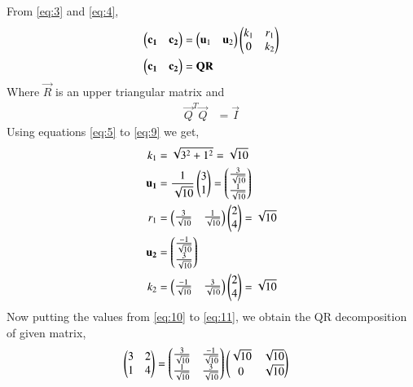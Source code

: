 \documentclass[journal,12pt,twocolumn]{IEEEtran}
\begin{document}
From \eqref{eq:3} and \eqref{eq:4}, 
\begin{align}
\begin{pmatrix}\mathbf{c_1} & \mathbf{c_2}\end{pmatrix} &= \begin{pmatrix}\mathbf{u}_1 & \mathbf{u}_2\end{pmatrix}\begin{pmatrix}k_1 & r_1 \\ 0 & k_2\end{pmatrix} \\
\begin{pmatrix}\mathbf{c_1} & \mathbf{c_2}\end{pmatrix} &= \mathbf{Q}\mathbf{R}
\end{align}
Where $\vec{R}$ is an upper triangular matrix and
\begin{align}
\vec{Q}^T\vec{Q}&=\vec{I}
\end{align}
Using equations \eqref{eq:5} to \eqref{eq:9} we get, 
\begin{align}
    k_1 &= \sqrt{3^2+1^2}=\sqrt{10} \label{eq:10}\\
    \mathbf{u_1} &= \frac{1}{\sqrt{10}}\begin{pmatrix}3\\1\end{pmatrix}= \begin{pmatrix}\frac{3}{\sqrt{10}} \\ \frac{1}{\sqrt{10}}\end{pmatrix} \\
    r_1 &= \begin{pmatrix}\frac{3}{\sqrt{10}} & \frac{1}{\sqrt{10}}\end{pmatrix}\begin{pmatrix}2\\4\end{pmatrix}=\sqrt{10} \\
    \mathbf{u_2} &= \begin{pmatrix}\frac{-1}{\sqrt{10}} \\ \frac{3}{\sqrt{10}}\end{pmatrix} \\
    k_2 &= \begin{pmatrix}\frac{-1}{\sqrt{10}} & \frac{3}{\sqrt{10}}\end{pmatrix}\begin{pmatrix}2\\4\end{pmatrix} = \sqrt{10} \label{eq:11}
\end{align}
Now putting the values from \eqref{eq:10} to \eqref{eq:11}, we obtain the QR decomposition of given matrix, 
\begin{align}
    \begin{pmatrix}3&2\\1&4\end{pmatrix} &= \begin{pmatrix}\frac{3}{\sqrt{10}}&\frac{-1}{\sqrt{10}}\\\frac{1}{\sqrt{10}}&\frac{3}{\sqrt{10}}\end{pmatrix}\begin{pmatrix}\sqrt{10}&\sqrt{10}\\0&\sqrt{10}\end{pmatrix}
\end{align}
\end{document}
